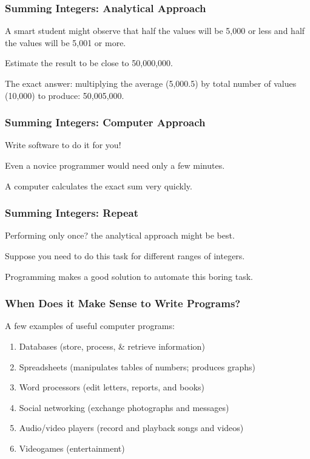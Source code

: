 \begin{frame}
\frametitle{Summing Integers: Analytical Approach}

A smart student might observe that half the values will be 5,000 or less and half the values will be 5,001 or more. 

Estimate the result to be close to 50,000,000. 

The exact answer: multiplying the average (5,000.5) by total number of values (10,000) to produce: 50,005,000.

\end{frame}

\begin{frame}
\frametitle{Summing Integers: Computer Approach}
Write software to do it for you!

Even a novice programmer would need only a few minutes.

A computer calculates the exact sum very quickly.

\end{frame}

\begin{frame}
\frametitle{Summing Integers: Repeat}
Performing only once? the analytical approach might be best.

Suppose you need to do this task for different ranges of integers.

Programming makes a good solution to automate this boring task.

\end{frame}

\begin{frame}
\frametitle{When Does it Make Sense to Write Programs?}

A few examples of useful computer programs:

\begin{enumerate}
	\item Databases (store, process, \& retrieve information) 	
	\item Spreadsheets (manipulates tables of numbers; produces graphs)
	\item Word processors (edit letters, reports, and books)
	\item Social networking (exchange photographs and messages)
	\item Audio/video players (record and playback songs and videos)
	\item Videogames (entertainment)
\end{enumerate}

\end{frame}

